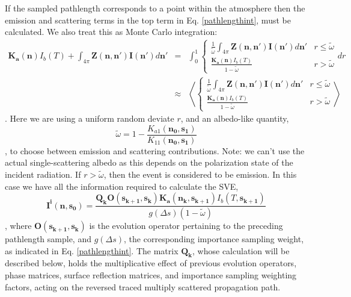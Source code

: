 If the sampled pathlength corresponds to a point within the
atmosphere then the emission and scattering terms in the top term in
Eq. \ref{pathlengthint}, must be calculated.  We also treat this as
Monte Carlo integration:
\begin{eqnarray}
\mathbf{K_a(n)}I_b(T)
+\int_{4\pi}\mathbf{Z(n,n')}\mathbf{I(n')}d\mathbf{n'}&=&\int_0^1\left\{\begin{array}{rl}\frac{1}{\tilde{\omega}}\int_{4\pi}\mathbf{Z(n,n')}\mathbf{I(n')}d\mathbf{n'}
& r \le \tilde{\omega}\\
\frac{\mathbf{K_a(n)}I_b(T)}{1-\tilde{\omega}}& r >
\tilde{\omega}\end{array}dr\right.\nonumber\\
&\approx&\left\langle\left\{\begin{array}{rl}\frac{1}{\tilde{\omega}}\int_{4\pi}\mathbf{Z(n,n')}\mathbf{I(n')}d\mathbf{n'}
& r \le \tilde{\omega}\\
\frac{\mathbf{K_a(n)}I_b(T)}{1-\tilde{\omega}}& r >
\tilde{\omega}\end{array}\right.\right\rangle
\label{emiss-or-scatter}
\end{eqnarray}.
Here we are using a uniform random deviate $r$, and an
albedo-like quantity,
\begin{equation}
\tilde{\omega}=1-\frac{K_{a1}(\mathbf{n_{0},s_{1}})}{K_{11}(\mathbf{n_{0},s_{1}})}
\end{equation}
, to choose between emission and scattering contributions.
Note: we can't use the actual single-scattering albedo as this depends
on the polarization state of the incident radiation.  If
$r>\tilde{\omega}$, then the event is considered to be emission.  In
this case we have all the information required to calculate the SVE,
\begin{equation}
\mathbf{I^i(n,s_0)}=\frac{\mathbf{Q_k O(s_{k+1},s_k)}
  \mathbf{K_a(n_k,s_{k+1})} I_b(T,\mathbf{s_{k+1}})}
  {g\left(\Delta s\right)\left(1-\tilde{\omega}\right)}
\label{Iemission}
\end{equation}
, where $\mathbf{O(s_{k+1},s_k)}$ is the evolution operator
pertaining to the preceding pathlength sample, and $g\left(\Delta
s\right)$, the corresponding importance sampling weight, as indicated
in Eq. \ref{pathlengthint}.  The matrix $\mathbf{Q_k}$, whose
calculation will be described below, holds the
multiplicative effect of previous evolution operators, phase matrices,
surface reflection matrices, and importance sampling weighting
factors, acting on the reversed traced multiply scattered propagation
path. 

